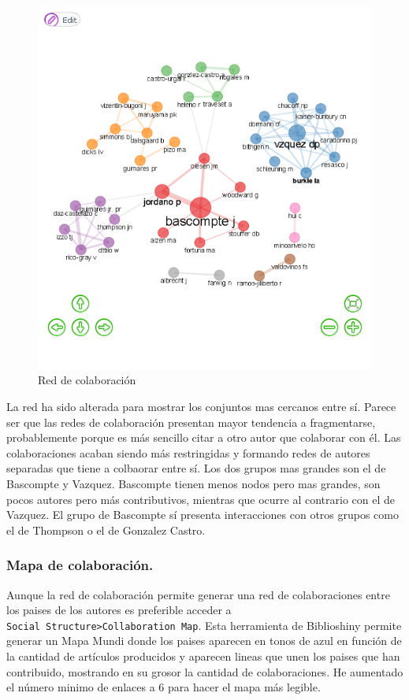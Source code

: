 \documentclass[
]{article}
\begin{document}
\begin{figure}
\centering
\includegraphics{RedDeColaboracion.png}
\caption{Red de colaboración}
\end{figure}

La red ha sido alterada para mostrar los conjuntos mas cercanos entre
sí. Parece ser que las redes de colaboración presentan mayor tendencia a
fragmentarse, probablemente porque es más sencillo citar a otro autor
que colaborar con él. Las colaboraciones acaban siendo más restringidas
y formando redes de autores separadas que tiene a colbaorar entre sí.
Los dos grupos mas grandes son el de Bascompte y Vazquez. Bascompte
tienen menos nodos pero mas grandes, son pocos autores pero más
contributivos, mientras que ocurre al contrario con el de Vazquez. El
grupo de Bascompte sí presenta interacciones con otros grupos como el de
Thompson o el de Gonzalez Castro.

\hypertarget{mapa-de-colaboraciuxf3n.}{%
\subsubsection{Mapa de colaboración.}\label{mapa-de-colaboraciuxf3n.}}

Aunque la red de colaboración permite generar una red de colaboraciones
entre los paises de los autores es preferible acceder a
\texttt{Social\ Structure\textgreater{}Collaboration\ Map}. Esta
herramienta de Biblioshiny permite generar un Mapa Mundi donde los
paises aparecen en tonos de azul en función de la cantidad de artículos
producidos y aparecen lineas que unen los paises que han contribuido,
mostrando en su grosor la cantidad de colaboraciones. He aumentado el
número minimo de enlaces a 6 para hacer el mapa más legible.
\end{document}
